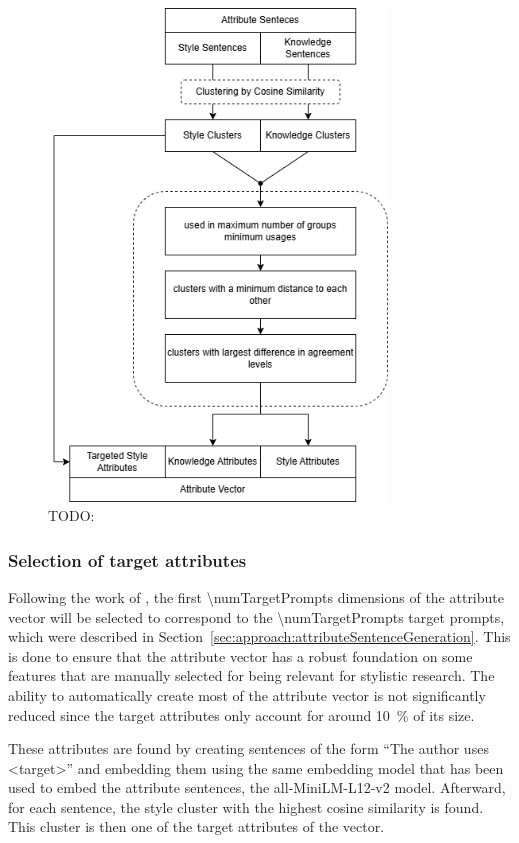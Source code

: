 \begin{figure}[ht]
  \begin{center}
    \includegraphics[width=9cm]{figures/clustering_diagram.png}
  \end{center}
  \caption{TODO:}
  \label{fig:clustering}
\end{figure}

\subsubsection{Selection of target attributes}
\label{sec:experiments:setup:selection:targetAttributes}
Following the work of \citet{patelLearningInterpretableStyle2023}, the first \num{\numTargetPrompts} dimensions of the attribute vector will be selected to correspond to the \num{\numTargetPrompts} target prompts, which were described in Section~\ref{sec:approach:attributeSentenceGeneration}.
This is done to ensure that the attribute vector has a robust foundation on some features that are manually selected for being relevant for stylistic research. The ability to automatically create most of the attribute vector is not significantly reduced since the target attributes only account for around \SI{10}{\percent} of its size.

These attributes are found by creating sentences of the form \enquote{The author uses <target>} and embedding them using the same embedding model that has been used to embed the attribute sentences, the all-MiniLM-L12-v2 model.
Afterward, for each sentence, the style cluster with the highest cosine similarity is found. This cluster is then one of the target attributes of the vector.

